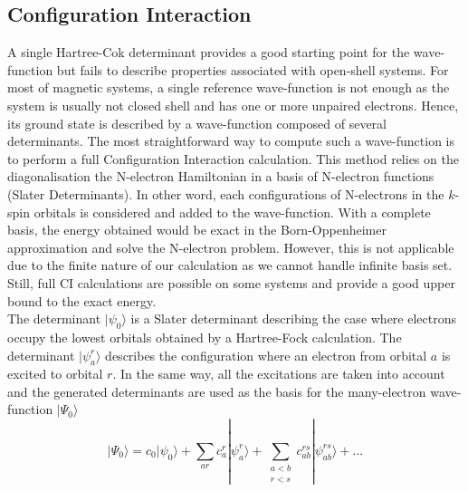 \documentclass[12pt]{report}
\numberwithin{equation}{section}
\begin{document}
\subsection{Configuration Interaction}

A single Hartree-Cok determinant provides a good starting point for the wave-function but fails to describe properties associated with open-shell systems.
For most of magnetic systems, a single reference wave-function is not enough as the system is usually not closed shell and has one or more unpaired electrons.
Hence, its ground state is described by a wave-function composed of several determinants.
The most straightforward way to compute such a wave-function is to perform a full Configuration Interaction calculation.
This method relies on the diagonalisation the N-electron Hamiltonian in a basis of N-electron functions (Slater Determinants).
In other word, each configurations of N-electrons in the $k$-spin orbitals is considered and added to the wave-function.
With a complete basis, the energy obtained would be exact in the Born-Oppenheimer approximation and solve the N-electron problem.
However, this is not applicable due to the finite nature of our calculation as we cannot handle infinite basis set.
Still, full CI calculations are possible on some systems and provide a good upper bound to the exact energy. \\
The determinant $|\psi_0\rangle$ is a Slater determinant describing the case where electrons occupy the lowest orbitals obtained by a Hartree-Fock calculation.
The determinant $|\psi_a^r\rangle$ describes the configuration where an electron from orbital $a$ is excited to orbital $r$.
In the same way, all the excitations are taken into account and the generated determinants are used as the basis for the many-electron wave-function $|\Psi_0\rangle$
\begin{equation}\label{eq:FullCI}
    | \Psi_0 \rangle = c_0 |\psi_0 \rangle + \sum_{ar} c_a^r |\psi_a^r \rangle + \sum_{\substack{a<b\\ r<s}} c_{ab}^{rs} |\psi_{ab}^{rs} \rangle + \ldots
\end{equation}
\end{document}
